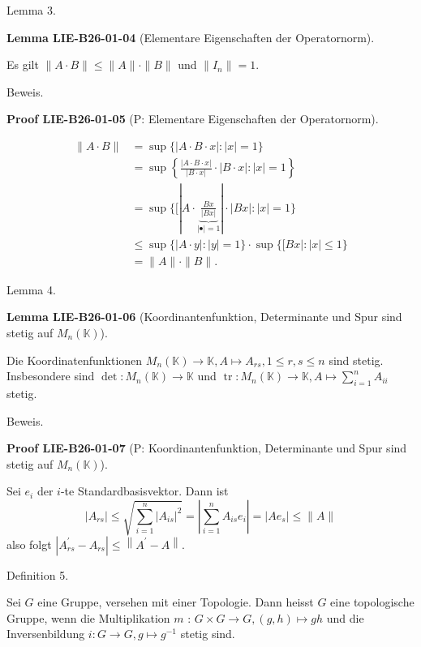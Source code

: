 \documentclass[10pt, letterpaper]{article}
\newcommand{\CustomHeading}[3]{%
  \par\medskip\noindent%
  \textbf{#1 #2} \textnormal{(#3)}.\enskip%
}
\newenvironment{LEM}[2]{\begin{unitbox}\CustomHeading{Lemma}{#1}{#2}}{\end{unitbox}}
\newenvironment{PROOF}[2]{\begin{unitbox}\CustomHeading{Proof}{#1}{#2}}{\end{unitbox}}
\begin{document}
Lemma 3. 


\begin{LEM}{LIE-B26-01-04}{Elementare Eigenschaften der Operatornorm}
Es gilt $\|A \cdot B\| \leq\|A\| \cdot\|B\|$ und $\left\|I_{n}\right\|=1$.
\end{LEM}

Beweis.

\begin{PROOF}{LIE-B26-01-05}{P: Elementare Eigenschaften der Operatornorm}
$$
\begin{aligned}
\|A \cdot B\| & =\sup \{|A \cdot B \cdot x|:|x|=1\} \\
& =\sup \left\{\frac{|A \cdot B \cdot x|}{|B \cdot x|} \cdot|B \cdot x|:|x|=1\right\} \\
& =\sup \{[|A \cdot \underbrace{\frac{B x}{|B x|}}_{|\bullet|=1}| \cdot|B x|:|x|=1\} \\
& \leq \sup \{|A \cdot y|:|y|=1\} \cdot \sup \{[B x|:|x| \leq 1\} \\
& =\|A\| \cdot\|B\| .
\end{aligned}
$$
\end{PROOF}



Lemma 4. 


\begin{LEM}{LIE-B26-01-06}{Koordinantenfunktion, Determinante und Spur sind stetig auf $M_{n}(\mathbb{K})$}
Die Koordinatenfunktionen $M_{n}(\mathbb{K}) \rightarrow \mathbb{K}, A \mapsto A_{r s}, 1 \leq r, s \leq n$ sind stetig. Insbesondere sind $\operatorname{det}: M_{n}(\mathbb{K}) \rightarrow \mathbb{K}$ und $\operatorname{tr}: M_{n}(\mathbb{K}) \rightarrow \mathbb{K}, A \mapsto \sum_{i=1}^{n} A_{i i}$ stetig.
\end{LEM}

Beweis. 

\begin{PROOF}{LIE-B26-01-07}{P: Koordinantenfunktion, Determinante und Spur sind stetig auf $M_{n}(\mathbb{K})$}
Sei $e_{i}$ der $i$-te Standardbasisvektor. Dann ist
$$
\left|A_{r s}\right| \leq \sqrt{\sum_{i=1}^{n}\left|A_{i s}\right|^{2}}=\left|\sum_{i=1}^{n} A_{i s} e_{i}\right|=\left|A e_{s}\right| \leq\|A\|
$$
also folgt $\left|A_{r s}^{\prime}-A_{r s}\right| \leq\left\|A^{\prime}-A\right\|$.
\end{PROOF}



Definition 5. 

Sei $G$ eine Gruppe, versehen mit einer Topologie. Dann heisst $G$ eine topologische Gruppe, wenn die Multiplikation $m$ : $G \times G \rightarrow G,(g, h) \mapsto g h$ und die Inversenbildung $i: G \rightarrow G, g \mapsto g^{-1}$ stetig sind.
\end{document}
